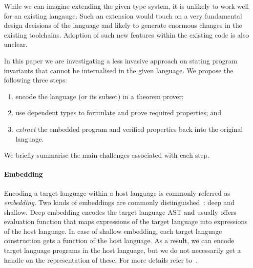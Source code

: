 \documentclass[acmsmall,review,anonymous]{acmart}\settopmatter{printfolios=true,printccs=false,printacmref=false}
\begin{document}
% 
% 
% 


While we can imagine extending the given type system, it is unlikely to work
well for an existing langauge.  Such an extension would touch on a very fundamental
design decisions of the language and likely to generate enormous changes in the
existing toolchains.  Adoption of such new features within the existing code
is also unclear.

In this paper we are investigating a less invasive approach on stating program
invariants that cannot be internalised in the given language.  We propose the
following three steps:
\begin{enumerate}
        \item encode the language (or its subset) in a theorem prover;
        \item use dependent types to formulate and prove required properties;
                and
        \item \emph{extract} the embedded program and verified properties back
                into the original language.
\end{enumerate}


We briefly summarise the main challenges associated with each step.

\paragraph{Embedding}
Encoding a target language within a host language is commonly referred as 
\emph{embedding}.
Two kinds of embeddings are commonly distinguished~\cite{}: deep and shallow.
Deep embedding encodes the target language AST and usually offers evaluation
function that maps expressions of the target language into expressions
of the host language.  In case of shallow embedding, each target language
construction gets a function of the host language.  As a result, we can encode
target language programs in the host language, but we do not necessarily get
a handle on the representation of these.  For more details refer to~\cite{}.
\end{document}
